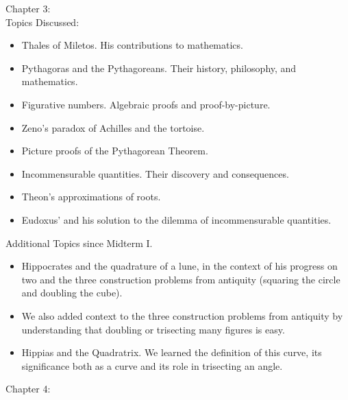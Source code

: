 \documentclass[11pt,fleqn]{article}
\begin{document}
Chapter 3:\\
Topics Discussed:
\begin{itemize}
\item Thales of Miletos. His contributions to mathematics.
\item Pythagoras and the Pythagoreans. Their history, philosophy, and mathematics.
\item Figurative numbers. Algebraic proofs and proof-by-picture.
\item Zeno's paradox of Achilles and the tortoise.
\item Picture proofs of the Pythagorean Theorem. 
\item Incommensurable quantities. Their discovery and consequences.
\item Theon's approximations of roots.
\item Eudoxus' and his solution to the dilemma of incommensurable quantities.\\
\end{itemize}

Additional Topics since Midterm I.\\

\begin{itemize}
\item Hippocrates and the quadrature of a lune, in the context of his progress on two and the three construction problems from antiquity (squaring the circle and doubling the cube).
\item We also added context to the three construction problems from antiquity by understanding that doubling or trisecting many figures is easy.
\item Hippias and the Quadratrix. We learned the definition of this curve, its significance both as a curve and its role in trisecting an angle.
\end{itemize}

Chapter 4:\\
\end{document}
